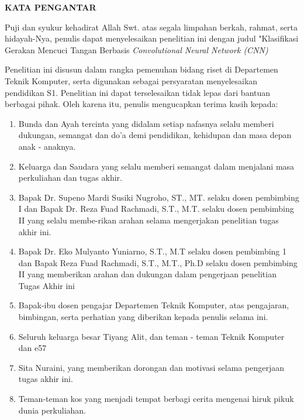 \begin{center}
  \Large
  \textbf{KATA PENGANTAR}
\end{center}


\vspace{2ex}

Puji dan syukur kehadirat Allah Swt. atas segala limpahan berkah, rahmat, serta hidayah-Nya, penulis dapat menyelesaikan penelitian ini dengan judul "Klasifikasi Gerakan Mencuci Tangan Berbasis \emph{Convolutional Neural Network (CNN)}

Penelitian ini disusun dalam rangka pemenuhan bidang riset di Departemen Teknik Komputer, serta digunakan sebagai persyaratan menyelesaikan pendidikan S1. Penelitian ini dapat terselesaikan tidak lepas dari bantuan berbagai pihak. Oleh karena itu, penulis mengucapkan terima kasih kepada:

\begin{enumerate}[nolistsep]

  \item Bunda dan Ayah tercinta yang didalam setiap nafasnya selalu memberi dukungan, semangat dan do'a demi pendidikan, kehidupan dan masa depan anak - anaknya.

  \item Keluarga dan Saudara yang selalu memberi semangat dalam menjalani masa perkuliahan dan tugas akhir.
  
  \item Bapak Dr. Supeno Mardi Susiki Nugroho, ST., MT. selaku dosen pembimbing I dan Bapak Dr. Reza Fuad Rachmadi, S.T., M.T. selaku dosen pembimbing II yang selalu membe-rikan arahan selama mengerjakan penelitian tugas akhir ini.

  \item Bapak Dr. Eko Mulyanto Yuniarno, S.T., M.T selaku dosen pembimbing 1 dan Bapak Reza Fuad Rachmadi, S.T., M.T., Ph.D selaku dosen pembimbing II yang memberikan arahan dan dukungan dalam pengerjaan penelitian Tugas Akhir ini
  
  \item Bapak-ibu dosen pengajar Departemen Teknik Komputer, atas pengajaran, bimbingan, serta perhatian yang diberikan kepada penulis selama ini.
  
  \item Seluruh keluarga besar Tiyang Alit, dan teman - teman Teknik Komputer dan e57
  
  \item Sita Nuraini, yang memberikan dorongan dan motivasi selama pengerjaan tugas akhir ini.
  
  \item Teman-teman kos yang menjadi tempat berbagi cerita mengenai hiruk pikuk dunia perkuliahan.

\end{enumerate}

